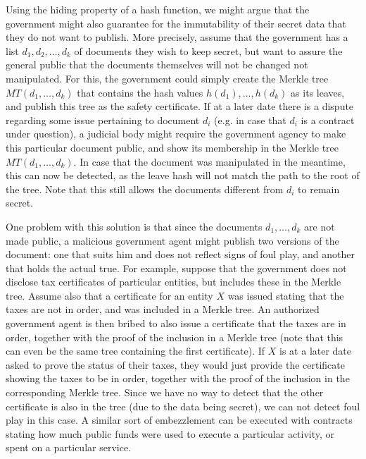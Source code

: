 

Using the hiding property of a hash function, we might argue that the government might also guarantee for the immutability of their secret data that they do not want to publish. More precisely, assume that the government has a list $d_1,d_2,\ldots ,d_k$ of documents they wish to keep secret, but want to assure the general public that the documents themselves will not be changed not manipulated. For this, the government could simply create the Merkle tree $MT(d_1,\ldots ,d_k)$ that contains the hash values $h(d_1),\ldots ,h(d_k)$ as its leaves, and publish this tree as the safety certificate. If at a later date there is a dispute regarding some issue pertaining to document $d_i$ (e.g. in case that $d_i$ is a contract under question), a judicial body might require the government agency to make this particular document public, and show its membership in the Merkle tree $MT(d_1,\ldots ,d_k)$. In case that the document was manipulated in the meantime, this can now be detected, as the leave hash will not match the path to the root of the tree. Note that this still allows the documents different from $d_i$ to remain secret.

One problem with this solution is that since the documents $d_1,\ldots ,d_k$ are not made public, a malicious government agent might publish two versions of the document: one that suits him and does not reflect signs of foul play, and another that holds the actual true. For example, suppose that the government does not disclose tax certificates of particular entities, but includes these in the Merkle tree. Assume also that a certificate for an entity $X$ was issued stating that the taxes are not in order, and was included in a Merkle tree. An authorized government agent is then bribed to also issue a certificate that the taxes are in order, together with the proof of the inclusion in a Merkle tree (note that this can even be the same tree containing the first certificate). If $X$ is at a later date asked to prove the status of their taxes, they would just provide the certificate showing the taxes to be in order, together with the proof of the inclusion in the corresponding Merkle tree. Since we have no way to detect that the other certificate is also in the tree (due to the data being secret), we can not detect foul play in this case. A similar sort of embezzlement can be executed with contracts stating how much public funds were used to execute a particular activity, or spent on a particular service.

